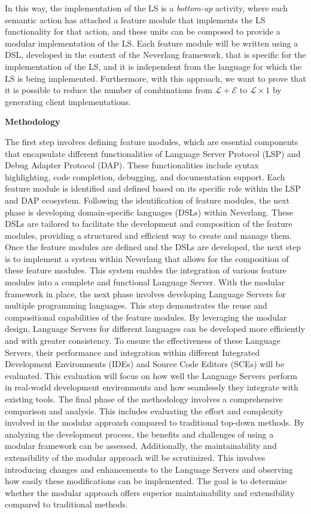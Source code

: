 In this way, the implementation of the LS is a \textit{bottom-up} activity, where each semantic action has attached a feature module that implements the LS functionality for that action, and these units can be composed to provide a modular implementation of the LS.
Each feature module will be written using a DSL, developed in the context of the Neverlang framework, that is specific for the implementation of the LS, and it is independent from the language for which the LS is being implemented.
Furthermore, with this approach, we want to prove that it is possible to reduce the number of combinations from $\mathcal{L} + \mathcal{E}$ to $\mathcal{L} \times 1$ by generating client implementations.

\hfill \break
\noindent
\textbf{Methodology}

The first step involves defining feature modules, which are essential components that encapsulate different functionalities of Language Server Protocol (LSP) and Debug Adapter Protocol (DAP). These functionalities include syntax highlighting, code completion, debugging, and documentation support. Each feature module is identified and defined based on its specific role within the LSP and DAP ecosystem. Following the identification of feature modules, the next phase is developing domain-specific languages (DSLs) within Neverlang. These DSLs are tailored to facilitate the development and composition of the feature modules, providing a structured and efficient way to create and manage them. Once the feature modules are defined and the DSLs are developed, the next step is to implement a system within Neverlang that allows for the composition of these feature modules. This system enables the integration of various feature modules into a complete and functional Language Server. With the modular framework in place, the next phase involves developing Language Servers for multiple programming languages. This step demonstrates the reuse and compositional capabilities of the feature modules. By leveraging the modular design, Language Servers for different languages can be developed more efficiently and with greater consistency. To ensure the effectiveness of these Language Servers, their performance and integration within different Integrated Development Environments (IDEs) and Source Code Editors (SCEs) will be evaluated. This evaluation will focus on how well the Language Servers perform in real-world development environments and how seamlessly they integrate with existing tools. The final phase of the methodology involves a comprehensive comparison and analysis. This includes evaluating the effort and complexity involved in the modular approach compared to traditional top-down methods. By analyzing the development process, the benefits and challenges of using a modular framework can be assessed. Additionally, the maintainability and extensibility of the modular approach will be scrutinized. This involves introducing changes and enhancements to the Language Servers and observing how easily these modifications can be implemented. The goal is to determine whether the modular approach offers superior maintainability and extensibility compared to traditional methods.


